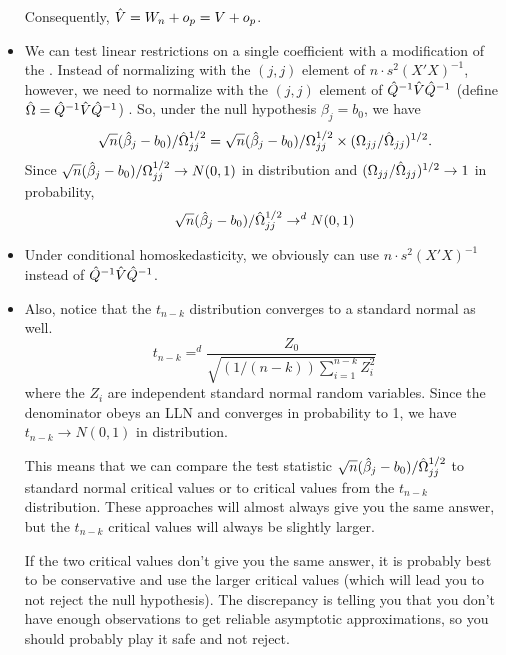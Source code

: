 \begin{itemize}[leftmargin=0pt]
  Consequently, $\hat{V} = W_n + o_p = V + o_p$.

\item We can test linear restrictions on a single coefficient with a
  modification of the \ttest.  Instead of normalizing with the $(j,j)$
  element of $n \cdot s^2 (X'X)^{-1}$, however, we need to normalize with
  the $(j,j)$ element of $\hat{Q}^{-1} \hat{V} \hat{Q}^{-1}$ (define $\hat{\Omega} =
  \hat{Q}^{-1} \hat{V} \hat{Q}^{-1}$) .  So, under the null hypothesis $\beta_j = b_0$,
  we have
  \begin{equation*}
    \sqrt{n} (\hat{\beta}_j - b_0) / \hat{\Omega}_{jj}^{1/2} =
    \sqrt{n} (\hat{\beta}_j - b_0) / \Omega_{jj}^{1/2} \times (\Omega_{jj} / \hat{\Omega}_{jj})^{1/2}.
  \end{equation*}
  Since $\sqrt{n} (\hat{\beta}_j - b_0) / \Omega_{jj}^{1/2} \to N(0, 1)$ in
  distribution and $(\Omega_{jj} / \hat{\Omega}_{jj})^{1/2} \to 1$ in probability,
  \begin{equation*}
    \sqrt{n} (\hat{\beta}_j - b_0) / \hat{\Omega}_{jj}^{1/2} \to^d N(0,1)
  \end{equation*}

\item Under conditional homoskedasticity, we obviously can use $n \cdot s^2
  (X'X)^{-1}$ instead of $\hat{Q}^{-1} \hat{V} \hat{Q}^{-1}$.

\item Also, notice that the $t_{n-k}$ distribution converges to a
  standard normal as well.
  \begin{equation*}
    t_{n-k} =^d \frac{Z_0}{\sqrt{(1/(n-k)) \sum_{i=1}^{n-k} Z_i^2}}
  \end{equation*}
  where the $Z_i$ are independent standard normal random variables.
  Since the denominator obeys an LLN and converges in probability to
  1, we have $t_{n-k} \to N(0,1)$ in distribution.

  This means that we can compare the test statistic $\sqrt{n} (\hat{\beta}_j -
  b_0) / \hat{\Omega}_{jj}^{1/2}$ to standard normal critical values or to
  critical values from the $t_{n-k}$ distribution.  These approaches
  will almost always give you the same answer, but the $t_{n-k}$
  critical values will always be slightly larger.

  If the two critical values don't give you the same answer, it is
  probably best to be conservative and use the larger critical values
  (which will lead you to not reject the null hypothesis).  The
  discrepancy is telling you that you don't have enough observations
  to get reliable asymptotic approximations, so you should probably
  play it safe and not reject.


\end{itemize}
